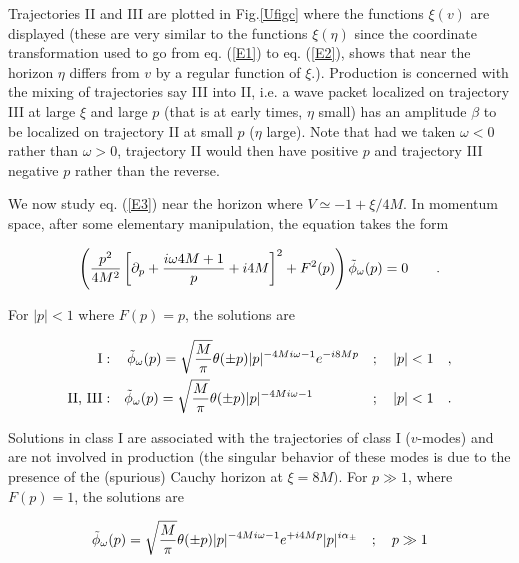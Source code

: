 \documentclass[12pt]{article}
\begin{document}
Trajectories II and III are plotted in Fig.\ref{Ufigc} where the functions $
\xi (v)$ are displayed (these are very similar to the functions $\xi(\eta)$
since the
coordinate transformation used to go from  eq. (\ref{E1}) to  eq. (\ref{E2}), shows
that near the horizon $ \eta$ differs from $v$ by a regular function of $\xi$.).
Production is concerned with the mixing of trajectories say III into II, i.e. a
wave packet localized on trajectory III at large $\xi$ and large $p$ (that is
at early times, $\eta$ small) has an amplitude $ \beta$ to be localized on
trajectory II at small $p$ ($\eta$ large). Note that had we taken $\omega <0$
rather than $\omega>0$, trajectory II would then have positive $p$ and
trajectory III negative $p$ rather than the reverse.



We now study  eq. (\ref{E3}) near the horizon where $ V \simeq - 1 + \xi / 4 M$.
In momentum space, after some elementary manipulation, the equation takes the
form 

\begin{equation}
\label{E4.3}
\left( {p^2 \over 4 M^2} \left [ \partial_p + {i \omega 4 M + 1 \over p} + i 4 M
\right ] ^2 + F^2 (p) \right ) \tilde \phi_\omega (p) = 0 \qquad .
\end{equation}



\noindent For $ \vert p \vert < 1 $ where $F(p) =p$, the solutions are

\begin{eqnarray}
\mbox{\rm I} &:& \tilde \phi_\omega (p) = \sqrt{ M \over \pi} \theta (\pm p) \vert
p\vert ^{-4 M i \omega -1} e^{-i 8 M p}\quad ; \quad \vert p \vert < 1 \quad ,\nonumber
\\ \mbox{\rm II, III} &:& \tilde \phi_\omega (p) 
= \sqrt{ M \over \pi} \theta (\pm p) \vert p \vert^{-4M i \omega
-1} \hspace{1.15 cm}\quad ; \quad \vert p \vert < 1 \quad .\label {E4.4}
\end{eqnarray}



\noindent Solutions in class I are associated with the trajectories of class I
($v$-modes) and are not involved in production (the singular
behavior of these modes is due to the presence of the (spurious) Cauchy horizon at $ \xi
= 8 M)$. For $ p \gg 1$,
where $F(p) = 1$, the solutions are

\begin{eqnarray}
\tilde \phi_\omega (p) = \sqrt{ M \over \pi} 
\theta (\pm p) \vert p \vert^{- 4
M i \omega - 1} e^{+i 4 M p} \vert p \vert^{i \alpha_\pm} \quad ; \quad  p \gg 1
\label{E4.5} \end{eqnarray}
\end{document}
